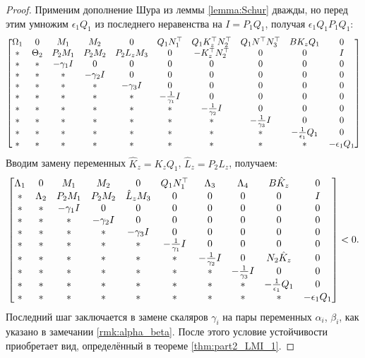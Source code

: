 \begin{proof}
	Применим дополнение Шура из леммы {\ref{lemma:Schur}} дважды, но перед этим умножим $\epsilon_1 Q_1$ из последнего неравенства на $I =P_1 Q_1$, получая  $\epsilon_1 Q_1 P_1 Q_1$: 
	\begin{equation}
		\begin{bmatrix}
			{\Omega}_1 & 0 & {M}_1 & {M}_2 & 0& {Q}_1{N}_1^\top & {Q}_1{K}_z^\top{N}_2^\top & {Q}_1 {N}^\top{N}_3^\top & B K_z Q_1 & 0
			\\
			* & {\Theta}_2 & {P}_2{M}_1 & {P}_2{M}_2 & {P}_2{L}_z{M}_3 & 0 & -{K}_z^\top{N}_2^\top & 0 & 0 & I\\
			* & * & -\gamma_1{I} & 0&0&0&0&0 &0&0\\
			* & * & * & -\gamma_2{I}&0&0&0&0 &0&0\\
			* & * & * & *&-\gamma_3{I}&0&0&0 &0&0\\
			* & * & * & *&*&-\frac{1}{\gamma_1}{I}&0&0 &0&0\\
			* & * & * & *&*&*&-\frac{1}{\gamma_2}{I}&0 &0&0\\
			*&* & * & * & *&*&*&-\frac{1}{\gamma_3}{I} &0&0\\
			*&* & * & * & *&*&*&* &-\frac{1}{\epsilon_1}{Q}_1&0\\
			* & * & * & *&*&*&*&*&*&-\epsilon_1{Q}_1
		\end{bmatrix}
	\end{equation}
	Вводим замену переменных $\hat{{K}}_z={K}_z{Q}_1$, $\hat{{L}}_z={P}_2{L}_z$, получаем:
	\begin{equation}
		\label{eq:thm3_LMI_before_alpha_beta}
		\begin{bmatrix}
			{\Lambda}_1 & 0 & {M}_1 & {M}_2&0 & {Q}_1{N}_1^\top & {\Lambda}_3& {\Lambda}_4 & {B}\hat{{K}}_z & 0\\
			* & {\Lambda}_2 & {P}_2{M}_1 & {P}_2{M}_2 & \hat{{L}}_z{M}_3& 0& 0&0&0&{I} \\
			* & * & -\gamma_1{I} & 0&0&0&0&0&0&0\\
			* & * &*  & -\gamma_2{I}&0&0&0&0&0&0\\
			*& * & * &*  & -\gamma_3{I}&0&0&0&0&0\\
			* &* & * & * & *&-\frac{1}{\gamma_1}{I}&0&0&0&0\\
			* & * & * &*& *&*&-\frac{1}{\gamma_2}{I}& 0&{N}_2\hat{{K}}_z&0\\
			*&*&* &* & * & * & *&-\frac{1}{\gamma_3}{I}&0&0\\
			* & * & *&*&* & *&*&*&-\frac{1}{\epsilon_1}{Q}_1&0\\
			* & * & * & *&*&*&*&*&*&-\epsilon_1{Q}_1\\
		\end{bmatrix}<0.
	\end{equation}
	Последний шаг заключается в замене скаляров $\gamma_i$ на пары переменных $\alpha_i$, $\beta_i$, как указано в замечании \ref{rmk:alpha_beta}. После этого условие устойчивости приобретает вид, определённый в теореме \ref{thm:part2_LMI_1}.
\end{proof}
